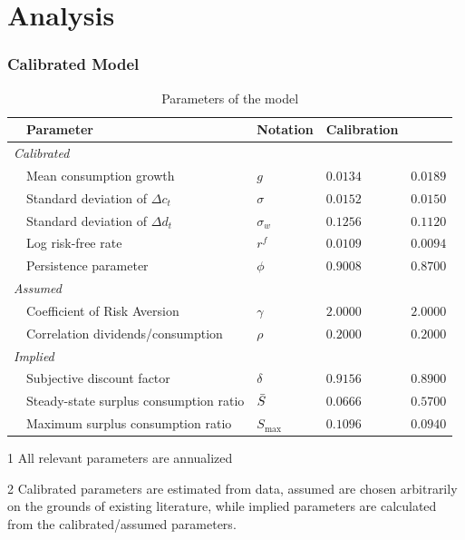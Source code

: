 \section{Analysis} \label{sec:Analysis}

\subsubsection{Calibrated Model}

\begin{table}[H]
\center
\begin{threeparttable}[b]
\caption{Parameters of the model}
\label{tab:ModelCalib}
\begin{tabular}{@{}llllc@{}}
\toprule
 & Parameter                              & Notation         & Calibration     & \citet{Campbell1999}\\ \midrule 
\multicolumn{5}{l}{\textit{Calibrated}}                                    \\
 & Mean consumption growth                & $g$              & $0.0134$  & $0.0189$\\
 & Standard deviation of $\Delta c_t$     & $\sigma$         & $0.0152$  & $0.0150$\\
 & Standard deviation of $\Delta d_t$     & $\sigma_w$       & $0.1256$  & $0.1120$\\
 & Log risk-free rate                     & $r^f$            & $0.0109$  & $0.0094$\\
 & Persistence parameter                  & $\phi$           & $0.9008$  & $0.8700$\\
 \multicolumn{5}{l}{\textit{Assumed}}                                      \\
 & Coefficient of Risk Aversion           & $\gamma$         & $2.0000$  & $2.0000$\\
 & Correlation dividends/consumption      & $\rho$           & $0.2000$  & $0.2000$\\
\multicolumn{5}{l}{\textit{Implied}}                                       \\
 & Subjective discount factor             & $\delta$         & $0.9156$  & $0.8900$\\
 & Steady-state surplus consumption ratio & $\Bar{S}$        & $0.0666$  & $0.5700$\\
 & Maximum surplus consumption ratio      & $S_{\text{max}}$ & $0.1096$  & $0.0940$\\ \bottomrule
\end{tabular}
\begin{tablenotes}
\footnotesize{\item [1] All relevant parameters are annualized
              \item [2] Calibrated parameters are estimated from data, assumed are chosen arbitrarily on the grounds of existing literature, while implied parameters are calculated from the calibrated/assumed parameters.}
\end{tablenotes}
\end{threeparttable}
\end{table}

